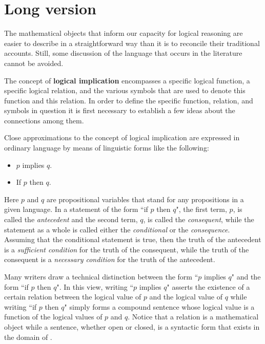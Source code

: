 \documentclass[12pt]{article}
\begin{document}
\section{Long version}

The mathematical objects that inform our capacity for logical reasoning are easier to describe in a straightforward way than it is to reconcile their traditional accounts.  Still, some discussion of the language that occurs in the literature cannot be avoided.

The concept of \textbf{logical implication} encompasses a specific logical function, a specific logical relation, and the various symbols that are used to denote this function and this relation.  In order to define the specific function, relation, and symbols in question it is first necessary to establish a few ideas about the connections among them.

Close approximations to the concept of logical implication are expressed in ordinary language by means of linguistic forms like the following:

\begin{itemize}
\item
$p$ implies $q$.
\item
If $p$ then $q$.
\end{itemize}

Here $p$ and $q$ are propositional variables that stand for any propositions in a given language.  In a statement of the form ``if $p$ then $q$", the first term, $p$, is called the \textit{antecedent} and the second term, $q$, is called the \textit{consequent}, while the statement as a whole is called either the \textit{conditional} or the \textit{consequence}.  Assuming that the conditional statement is true, then the truth of the antecedent is a \textit{sufficient condition} for the truth of the consequent, while the truth of the consequent is a \textit{necessary condition} for the truth of the antecedent.

Many writers draw a technical distinction between the form ``$p$ implies $q$" and the form ``if $p$ then $q$".  In this view, writing ``$p$ implies $q$" asserts the existence of a certain relation between the logical value of $p$ and the logical value of $q$ while writing ``if $p$ then $q$" simply forms a compound sentence whose logical value is a function of the logical values of $p$ and $q$.  Notice that a relation is a mathematical object while a sentence, whether open or closed, is a syntactic form that exists in the domain of .
\end{document}

